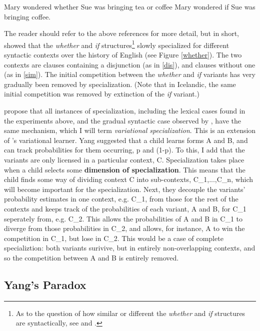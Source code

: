 \documentclass{artikel3}
\begin{document}
\begin{exe}
    \ex \label{dis} Mary wondered whether Sue was bringing tea or coffee
    \ex \label{sim} Mary wondered if Sue was bringing coffee.
\end{exe}

\noindent The reader should refer to the above references for more detail, but in short, \citet{baileywallenbergwurff2012} showed that the \textsl{whether} and \textsl{if} structures\footnote{As to the question of how similar or different the \textsl{whether} and \textsl{if} structures are syntactically, see \citet{larson1985} and \citet{hanromero2004}.} slowly specialized for different syntactic contexts over the history of English (see Figure \ref{whether}). The two contexts are clauses containing a disjunction (as in \ref{dis}), and clauses without one (as in \ref{sim}). The initial competition between the \textsl{whether} and \textsl{if} variants has very gradually been removed by specialization. (Note that in Icelandic, the same initial competition was removed by extinction of the \textsl{if} variant.)

\citet{fruehwaldwallenberg2013} propose that all instances of specialization, including the lexical cases found in the experiments above, and the gradual syntactic case observed by \citet{baileywallenbergwurff2012}, have the same mechanism, which I will term \textsl{variational specialization}. This is an extension of \citet{yang2000, yang2002}'s variational learner. Yang suggested that a child learns forms A and B, and can track probabilities for them occurring, p and (1-p). To this, I add that the variants are only licensed in a particular context, C. Specialization takes place when a child selects some \textbf{dimension of specialization}. This means that the child finds some way of dividing context C into sub-contexts, C_1,...,C_n, which will become important for the specialization. Next, they decouple the variants’ probability estimates in one context, e.g. C_1, from those for the rest of the contexts and keeps track of the probabilities of each variant, A and B, for C_1 seperately from, e.g. C_2. This allows the probabilities of A and B in C_1 to diverge from those probabilities in C_2, and allows, for instance, A to win the competition in C_1, but lose in C_2. This would be a case of complete specializtion: both variants surivive, but in entirely non-overlapping contexts, and so the competition between A and B is entirely removed.



\subsection{Yang's Paradox}
\label{yangparadox}
\end{document}
